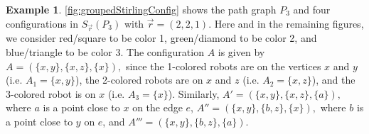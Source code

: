 \documentclass{amsart}
\newcommand{\Sr}{S_{\vec{r}}}
\newcommand{\vertex}[3][1]{
\node [circle,  fill, inner sep = 0pt,outer sep = 0pt, minimum size=#1mm] (#3) at #2 {};
}
\newcommand{\fg}[1]{
    \pgfdeclarelayer{foreground}
    \pgfsetlayers{main,foreground}
    \begin{pgfonlayer}{foreground}
    #1
    \end{pgfonlayer}
    }
\theoremstyle{definition}
\newtheorem{ex}[thm]{Example}
\theoremstyle{remark}
\begin{document}
\begin{ex} \cref{fig:groupedStirlingConfig} shows the path graph $P_3$ and four configurations in $\Sr(P_3)$ with $\vec r = (2,2,1)$. Here and in the remaining figures, we consider red/square to be color 1, green/diamond to be color 2, and blue/triangle to be color 3. The configuration $A$ is given by $A=(\{x,y\},\{x,z\},\{x\}),$ since the 1-colored robots are on the vertices $x$ and $y$ (i.e. $A_1=\{x,y\}$), the 2-colored robots are on $x$ and $z$ (i.e. $A_2=\{x,z\}$), and the 3-colored robot is on $x$ (i.e. $A_3=\{x\}$). Similarly, $A'=(\{x,y\},\{x,z\},\{a\}),$ where $a$ is a point close to $x$ on the edge $e$,  $A''=(\{x,y\},\{b,z\},\{x\}),$ where $b$ is a point close to $y$ on $e$, and $A'''=(\{x,y\},\{b,z\},\{a\}).$

\begin{figure}[h!]
    \centering
\end{figure}
\end{ex}
\end{document}
